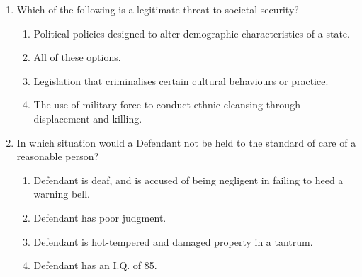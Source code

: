 \documentclass[12pt]{article}
\begin{document}
\begin{enumerate}[label=\arabic*.]
\begin{enumerate}[label=(\alph*)]
\end{enumerate}
\item Which of the following is a legitimate threat to societal security?
\begin{enumerate}[label=(\alph*)]
    \item Political policies designed to alter demographic characteristics of a state.
    \item All of these options.
    \item Legislation that criminalises certain cultural behaviours or practice.
    \item The use of military force to conduct ethnic-cleansing through displacement and killing.
\end{enumerate}
\item In which situation would a Defendant not be held to the standard of care of a reasonable person?
\begin{enumerate}[label=(\alph*)]
    \item Defendant is deaf, and is accused of being negligent in failing to heed a warning bell.
    \item Defendant has poor judgment.
    \item Defendant is hot-tempered and damaged property in a tantrum.
    \item Defendant has an I.Q. of 85.
\end{enumerate}
\end{enumerate}
\end{document}
